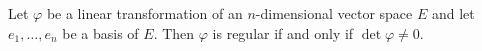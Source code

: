 Let $\varphi$ be a linear transformation of an $n$-dimensional vector space $E$ and let $e_1, \ldots, e_n$ be a basis of $E$. Then $\varphi$ is regular if and only if $\det \varphi \neq 0$.
